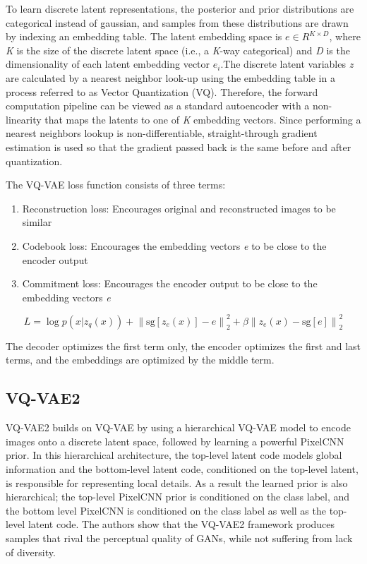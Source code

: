\documentclass{article}
\begin{document}
To learn discrete latent representations, the posterior and prior distributions are categorical instead of gaussian, and samples from these distributions are drawn by indexing an embedding table. The latent embedding space is \(e \in R^{K \times D}\), where \textit{K} is the size of the discrete latent space (i.e., a \textit{K}-way categorical) and \textit{D} is the dimensionality of each latent embedding vector \(e_{i}\).The discrete latent variables \textit{z} are calculated by a nearest neighbor look-up using the embedding table in a process referred to as Vector Quantization (VQ). Therefore, the forward computation pipeline can be viewed as a standard autoencoder with a non-linearity that maps the latents to one of \textit{K} embedding vectors. Since performing a nearest neighbors lookup is non-differentiable, straight-through gradient estimation is used so that the gradient passed back is the same before and after quantization. 

The VQ-VAE loss function consists of three terms: 
\begin{enumerate}
\item Reconstruction loss: Encourages original and reconstructed images to be similar
\item Codebook loss: Encourages the embedding vectors \textit{e} to be close to the encoder output 
\item Commitment loss: Encourages the encoder output to be close to the embedding vectors \textit{e} 
\end{enumerate}

\begin{equation}
L = \log{p(x|z_q(x))} + {\|\textrm{sg}[z_e(x)]-e\|}_{2}^{2} + \beta{\|z_e(x)-\textrm{sg}[e]\|}_{2}^{2}
\end{equation}

The decoder optimizes the first term only, the encoder optimizes the first and last terms, and the embeddings are optimized by the middle term. 

\subsection{VQ-VAE2}

VQ-VAE2 builds on VQ-VAE by using a hierarchical VQ-VAE model to encode images onto a discrete latent space, followed by learning a powerful PixelCNN prior. In this hierarchical architecture, the top-level latent code models global information and the bottom-level latent code, conditioned on the top-level latent, is responsible for representing local details. As a result the learned prior is also hierarchical; the top-level PixelCNN prior is conditioned on the class label, and the bottom level PixelCNN is conditioned on the class label as well as the top-level latent code. The authors show that the VQ-VAE2 framework produces samples that rival the perceptual quality of GANs, while not suffering from lack of diversity. 
\end{document}
